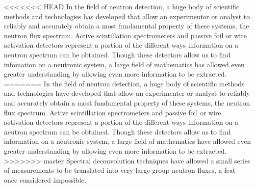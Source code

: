 <<<<<<< HEAD
In the field of neutron detection, a huge body of scientific methods and technologies has developed that allow an experimentor or analyst to reliably and accurately obtain a most fundamental property of these systems, the neutron flux spectrum.
Active scintillation spectrometers and passive foil or wire activation detectors represent a portion of the different ways information on a neutron spectrum can be obtained.
Though these detectors allow us to find infomation on a neutronic system, a large field of mathematics has allowed even greater understanding by allowing even more information to be extracted.
=======
In the field of neutron detection, a huge body of scientific methods and technologies have developed that allow an experimenter or analyst to reliably and accurately obtain a most fundamental property of these systems, the neutron flux spectrum.
Active scintillation spectrometers and passive foil or wire activation detectors represent a portion of the different ways information on a neutron spectrum can be obtained.
Though these detectors allow us to find information on a neutronic system, a large field of mathematics have allowed even greater understanding by allowing even more information to be extracted.
>>>>>>> master
Spectral deconvolution techniques have allowed a small series of measurements to be translated into very large group neutron fluxes, a feat once considered impossible.

